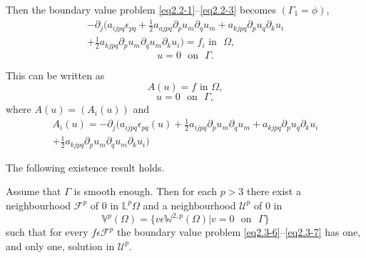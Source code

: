 Then the boundary value problem \eqref{eq2.2-1}--\eqref{eq2.2-3}
becomes $(\Gamma_1=\phi)$, 
\begin{multline*}
  -\partial_j(a_{ijpq} \epsilon_{pq} + \frac{1}{2} a_{ajpq}
  \partial_p u_m \partial_q u_m + a_{kjpq} \partial_p u_q \partial_k
  u_i \\
  + \frac{1}{2} a_{kjpq} \partial_p u_m \partial _q u_m \partial
  _k u_i) = f_i  \text{~in ~} \Omega,\tag{2.3-4} \label{eq2.3-4} 
\end{multline*}\pageoriginale
\begin{equation*}
u=0 \text{~ on ~} \Gamma.\tag{2.3-5}\label{eq2.3-5} 
\end{equation*}

This can be written as 
\begin{equation*}
A(u)= f \text{~in~} \Omega,\tag{2.3-6}\label{eq2.3-6} 
\end{equation*}
\begin{equation*}
u=0 \text{~ on ~} \Gamma,\tag{2.3-7}\label{eq2.3-7} 
\end{equation*}
where $A(u) = (A_i (u))$ and 
\begin{multline*}
  A_i (u)= - \partial_j (a_{ijpq} \epsilon_{pq} (u)+ \frac{1}{2}
  a_{ijpq} \partial_p u_m \partial _q u_m + a_{kjpq} \partial_p u_q
  \partial _k u_i \\
  + \frac{1}{2} a_{kjpq} \partial _p u_m \partial_q
  u_m \partial _k u_i)\tag{2.3-8} \label{eq2.3-8} 
\end{multline*}

The following existence result holds.

\begin{theorem}\label{chap2-thm2.3.1}%
  Assume that $\Gamma$ is smooth enough. Then for each $p>3$ there
  exist a neighbourhood $\mathscr{F}^p$ of $0$ in
  $\mathbb{L}^p{\Omega}$ and a neighbourhood $\mathcal{U}^p$ of $0$ in  
  $$
  \mathbb{V}^p(\Omega) = \{v \epsilon \mathbb{W}^{2,p} (\Omega) | v
  = 0 \text{~ on ~} \Gamma\} 
  $$
  such that for every $f \epsilon\mathscr{F}^p$ the boundary value
  problem \eqref{eq2.3-6}--\eqref{eq2.3-7} has one, and only one, solution in
  $\mathcal{U}^p$.  
\end{theorem}
 
